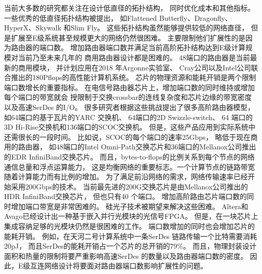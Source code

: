 当前大多数的研究都关注在设计低直径的拓扑结构，
同时优化成本和其他指标。一些优秀的低直径拓扑结构被提出，
如Flattened Butterfly、Dragonfly、
HyperX、Skywalk 和Slim Fly。
这些拓扑结构虽然能够提供较低的网络直径，
但是扩展至E级系统甚至规模更大的网络仍然很困难。
主要限制他们扩展性的是因为路由器的端口数。
增加路由器端口数并满足当前高阶拓扑结构达到E级计算规模对当前乃至未来几年的
商用路由器设计都是困难的。
48端口的路由器是当前最新的商用模块，
并计划应用在2018 年Argonne实验室、
Cray公司以及Intel公司联合推出的180Pflops的高性能计算机系统。
芯片的物理资源和能耗开销是两个限制端口数增长的重要指标。
在电信号路由器芯片上，增加端口数的同时维持或增加每个端口的带宽就会
授限制于交换crossbar的连线复杂度和芯片边缘的带宽密度
以及高速SerDes 的I/O。
很多研究者根据这些挑战提出了很多高阶路由器模型，
如64端口的基于瓦片的YARC 交换机、
64端口的2D Swizzle-switch、
64 端口的3D Hi-Rise交换机和136端口的SCOC交换机。
但是，这些产品应用到实际系统中还需很长的一段时间。
比如说，SCOC的每个端口的速率25Gbps，
略低于现在商用的路由器，
如48端口的Intel Omni-Path交换芯片和36端口的Mellanox公司推出的EDR InfiniBand交换芯片。
而且，bytes-to-flops的比例关系到每个节点的网络通信总量和浮点运算能力，
这是均衡网络的重要标志。一个计算节点的链路带宽随着计算能力而有比例的增加。
为了满足前沿网络的需求，网络传输速率已经开始采用200Gbps的技术。
当前最先进的200G交换芯片是由Mellanox公司推出的HDR InfiniBand交换芯片，
但也只有40 个端口。
增加高阶路由芯片端口数的同时增加端口带宽是非常困难的。
硅光子技术被期望来解决这些困难。
Altera和Avago已经设计出一种基于嵌入并行光模块的光信号FPGA。
但是，在一块芯片上集成容纳足够的光模块仍然是很困难的工作。
端口数增加的同时也会增加芯片的能耗开销。
例如，在天河二号计算系统中一条SerDes 链路传输一个比特需要消耗20pJ，
而且SerDes的能耗开销占一个芯片的总开销的$79\%$。
而且，物理封装设计面积和热量的限制将要严重影响高速SerDes
的数量以及路由器端口数的密度。
因此，E级互连网络设计将要面对路由器端口数影响扩展性的问题。

